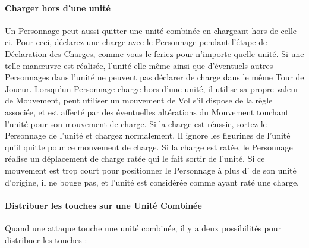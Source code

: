 \paragraph{Charger hors d'une unité}

Un Personnage peut aussi quitter une unité combinée en chargeant hors de celle-ci. Pour ceci, déclarez une charge avec le Personnage pendant l'étape de Déclaration des Charges, comme vous le feriez pour n'importe quelle unité. Si une telle manœuvre est réalisée, l'unité elle-même ainsi que d'éventuels autres Personnages dans l'unité ne peuvent pas déclarer de charge dans le même Tour de Joueur.  Lorsqu'un Personnage charge hors d'une unité, il utilise sa propre valeur de Mouvement, peut utiliser un mouvement de Vol s'il dispose de la règle associée, et est affecté par des éventuelles altérations du Mouvement touchant l'unité pour son mouvement de charge. Si la charge est réussie, sortez le Personnage de l'unité et chargez normalement. Il ignore les figurines de l'unité qu'il quitte pour ce mouvement de charge. Si la charge est ratée, le Personnage réalise un déplacement de charge ratée qui le fait sortir de l'unité. Si ce mouvement est trop court pour positionner le Personnage à plus d' de son unité d'origine, il ne bouge pas, et l'unité est considérée comme ayant raté une charge.

\paragraph{Distribuer les touches sur une Unité Combinée}

Quand une attaque touche une unité combinée, il y a deux possibilités pour distribuer les touches :

